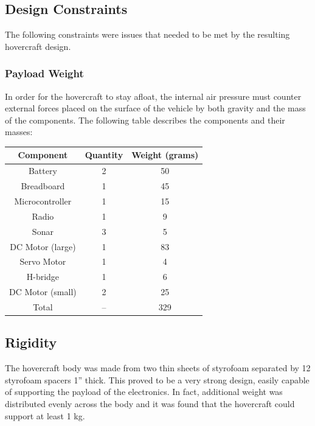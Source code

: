 \subsection{Design Constraints}
The following constraints were issues that needed to be met by the resulting hovercraft design.

\subsubsection{Payload Weight}
In order for the hovercraft to stay afloat, the internal air pressure must counter external forces placed on the surface of the vehicle by both gravity and the mass of the components. The following table describes the components and their masses:

\begin{minipage}{6.5in}
\begin{center}
\begin{tabular}{ c c c}
  Component & Quantity & Weight (grams) \\
  \hline
	Battery  &	2 & 	50 \\
	Breadboard &	1 &	45 \\
	Microcontroller &	1 &	15 \\
	Radio &	1 &	9 \\
	Sonar &	3 &	5 \\
	DC Motor (large) &	1 &	83 \\
	Servo Motor &	1 &	4 \\
	H-bridge &	1 &	6 \\
	DC Motor (small) &	2 &	25 \\
	Total &	-- &	329 \\
\end{tabular}
\end{center}
\label{restingTable}
\end{minipage}

\subsection{Rigidity}
The hovercraft body was made from two thin sheets of styrofoam separated by 12 styrofoam spacers 1'' thick. This proved to be a very strong design, easily capable of supporting the payload of the electronics. In fact, additional weight was distributed evenly across the body and it was found that the hovercraft could support at least 1 kg.

